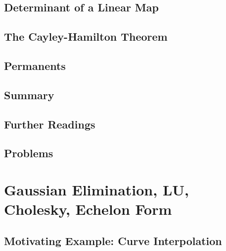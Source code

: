 \documentclass[a4paper]{article}
\begin{document}
\subsection{ Determinant of a Linear Map} %

\subsection{ The Cayley-Hamilton Theorem} %

\subsection{ Permanents} %

\subsection{ Summary} %

\subsection{ Further Readings} %

\subsection{ Problems} %


\newpage
\section{Gaussian Elimination, LU, Cholesky, Echelon Form}
\subsection{ Motivating Example: Curve Interpolation} %
\end{document}
